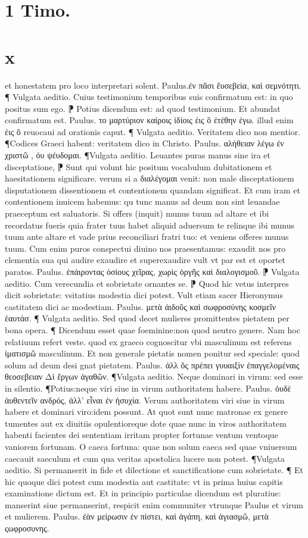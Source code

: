 \documentclass{article}
\begin{document}
\begin{pages}
\section*{1 Timo. }
\section*{x }
\marginpar{[ p.204 ]}\pstart et honestatem pro loco interpretari solent. Paulus.ἐν πᾶσι ἔυσεβεία, καὶ σεμνότητι.  ¶ Vulgata aeditio. Cuius testimonium temporibus suis confirmatum est: in quo   positus sum ego. ⁋ Potius dicendum est: ad quod testimonium. Et abundat confirmatum est. Paulus. το μαρτύριον καίροις ἰδίοις ἐις ὃ ἐτέθην ἐγω. illud enim ἐις ὃ   reuocaui ad orationis caput. ¶ Vulgata aeditio. Veritatem dico  non mentior. ¶Codices Graeci habent: veritatem dico in Christo. Paulus. αλήθειαν λέγω ἐν χριστῶ , ὀυ ψέυδομαι. ¶Vulgata aeditio. Leuantes puras manus sine ira et disceptatione, ⁋ Sunt qui volunt hic positum vocabulum dubitationem et haesitationem significare. verum si a διαλέγομαι venit: non male disceptationem  disputationem dissentionem et contentionem quandam significat. Et cum iram et contentionem inuicem habemus: qu tunc manus ad deum non sint leuandae praeceptum est saluatoris. Si offers (inquit) munus tuum ad altare et ibi recordatus fueris quia frater tuus habet aliquid aduersum te  relinque ibi munus tuum ante altare et vade prius reconciliari fratri tuo: et veniens offeres munus tuum. Cum enim puros conspectui diuino nos praesentamus: exaudit nos pro clementia sua qui audire exaudire  et superexaudire vult  vt par est et oportet paratos. Paulus. ἐπάιροντας ὁσίους χεῖρας, χωρὶς ὀργῆς καὶ διαλογισμοῦ. ⁋ Vulgata aeditio. Cum verecundia et sobrietate ornantes se. ⁋ Quod hic vetus interpres dicit sobrietate: vsitatius modestia dici potest. Vult etiam sacer Hieronymus castitatem dici ac modestiam. Paulus. μετὰ ἀιδοῦς καὶ σωφροσύνης κοσμεῖν ἐαυτάσ. ¶ Vulgata aeditio. Sed quod decet mulieres promittentes pietatem per bona opera. ¶ Dicendum esset quae  foeminine:non quod  neutro genere. Nam hoc relatiuum refert veste. quod ex graeco cognoscitur vbi masculinum est referens ἱματισμῶ masculinum. Et non generale pietatis nomen ponitur sed speciale: quod solum ad deum desi gnat pietatem. Paulus. ἀλλ ὅς  πρέπει γυυαιξὶν ἐπαγγελομέναις θεοσεβειαν   Δἰ ἔργων ἀγαθῶν. ¶Vulgata aeditio. Neque  dominari in virum: sed esse in silentio. ¶Potius:neque  viri siue in virum authoritatem habere. Paulus. ὀυδὲ ἀυθεντεῖν ανδρός, ἀλλ’ εἶναι ἐν ἠσυχία. Verum authoritatem viri siue in virum habere  et dominari viro:idem possunt. At quot sunt nunc matronae ex genere tumentes aut ex diuitiis opulentioreque  dote  quae nunc in viros authoritatem habenti facientes dei sententiam irritam propter fortunae ventum ventoque  vaniorem fortunam. O caeca fortuna: quae non solum caeca sed quae vniuersum caecauit saeculum et cum qua veritas apostolica lucere   non potest. ¶Vulgata aeditio. Si permanserit in fide et dilectione  et sanctificatione cum   sobrietate. ¶ Et hic quoque  dici potest cum modestia aut castitate: vt in prima huius capitis examinatione dictum est. Et in principio particulae dicendum est pluratiue: manserint siue permanserint, respicit enim communiter vtrunque  Paulus  et virum  et mulierem. Paulus. ἐὰν μείρωσιν ἐν πίστει, καὶ ἀγάπη, καὶ ἀγιασμῶ, μετὰ ςωφροσυνης.  \pend

\end{pages}
\end{document}
